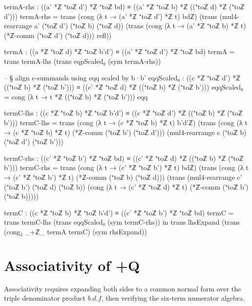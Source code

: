 \documentclass[11pt,a4paper]{book}
\def\cdot{.}%
\def\mathbb#1{#1}%
\def\texorpdfstring#1#2{#2}%
\begin{document}
\begin{code}
    termA-rhs : ((a' *ℤ ⁺toℤ d') *ℤ ⁺toℤ bd) ≡ ((a' *ℤ ⁺toℤ b) *ℤ ((⁺toℤ d) *ℤ (⁺toℤ d')))
    termA-rhs =
      trans
        (cong (λ t → (a' *ℤ ⁺toℤ d') *ℤ t) bdℤ)
        (trans
          (mul4-rearrange a' (⁺toℤ d') (⁺toℤ b) (⁺toℤ d))
          (trans
            (cong (λ t → (a' *ℤ ⁺toℤ b) *ℤ t) (*ℤ-comm (⁺toℤ d') (⁺toℤ d)))
            refl))

    termA : ((a *ℤ ⁺toℤ d) *ℤ ⁺toℤ b'd') ≡ ((a' *ℤ ⁺toℤ d') *ℤ ⁺toℤ bd)
    termA =
      trans
        termA-lhs
        (trans
          eqpScaled₀
          (sym termA-rhs))

    -- § align c-summands using eqq scaled by b·b'
    eqqScaled₀ : ((c *ℤ ⁺toℤ d') *ℤ ((⁺toℤ b) *ℤ (⁺toℤ b'))) ≡ ((c' *ℤ ⁺toℤ d) *ℤ ((⁺toℤ b) *ℤ (⁺toℤ b')))
    eqqScaled₀ = cong (λ t → t *ℤ ((⁺toℤ b) *ℤ (⁺toℤ b'))) eqq

    termC-lhs : ((c *ℤ ⁺toℤ b) *ℤ ⁺toℤ b'd') ≡ ((c *ℤ ⁺toℤ d') *ℤ ((⁺toℤ b) *ℤ (⁺toℤ b')))
    termC-lhs =
      trans
        (cong (λ t → (c *ℤ ⁺toℤ b) *ℤ t) b'd'ℤ)
        (trans
          (cong (λ t → (c *ℤ ⁺toℤ b) *ℤ t) (*ℤ-comm (⁺toℤ b') (⁺toℤ d')))
          (mul4-rearrange c (⁺toℤ b) (⁺toℤ d') (⁺toℤ b')))

    termC-rhs : ((c' *ℤ ⁺toℤ b') *ℤ ⁺toℤ bd) ≡ ((c' *ℤ ⁺toℤ d) *ℤ ((⁺toℤ b) *ℤ (⁺toℤ b')))
    termC-rhs =
      trans
        (cong (λ t → (c' *ℤ ⁺toℤ b') *ℤ t) bdℤ)
        (trans
          (cong (λ t → (c' *ℤ ⁺toℤ b') *ℤ t) (*ℤ-comm (⁺toℤ b) (⁺toℤ d)))
          (trans
            (mul4-rearrange c' (⁺toℤ b') (⁺toℤ d) (⁺toℤ b))
            (cong (λ t → (c' *ℤ ⁺toℤ d) *ℤ t) (*ℤ-comm (⁺toℤ b') (⁺toℤ b)))))

    termC : ((c *ℤ ⁺toℤ b) *ℤ ⁺toℤ b'd') ≡ ((c' *ℤ ⁺toℤ b') *ℤ ⁺toℤ bd)
    termC =
      trans
        termC-lhs
        (trans
          eqqScaled₀
          (sym termC-rhs))
  in
  trans
    lhsExpand
    (trans
      (cong₂ _+ℤ_ termA termC)
      (sym rhsExpand))
\end{code}

\section{Associativity of \texorpdfstring{$+_{\mathbb{Q}}$}{+Q}}

Associativity requires expanding both sides to a common normal form over the
triple denominator product $b \cdot d \cdot f$, then verifying the six-term
numerator algebra.
\end{document}
